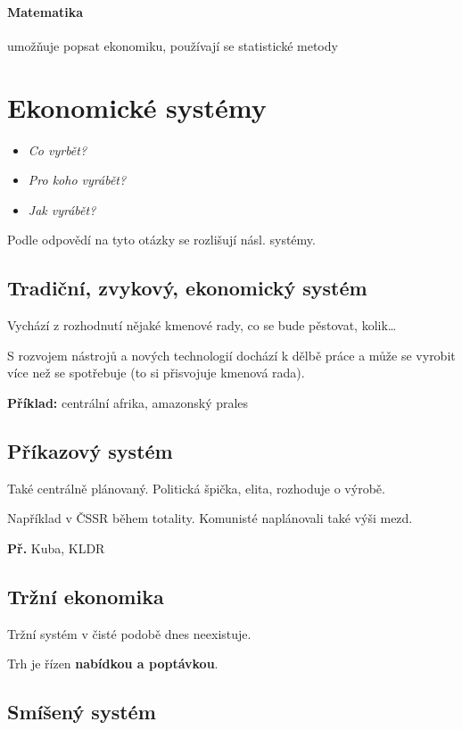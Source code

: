 \documentclass[10pt,a4paper,
twoside,%
]{report}
\begin{document}
\paragraph{Matematika} umožňuje popsat ekonomiku, používají se statistické metody

\section{Ekonomické systémy}

\begin{itemize}
\item\emph{Co vyrbět?}
\item\emph{Pro koho vyrábět?}
\item\emph{Jak vyrábět?}
\end{itemize}

Podle odpovědí na tyto otázky se rozlišují násl. systémy.

\subsection{Tradiční, zvykový, ekonomický systém}

Vychází z rozhodnutí nějaké kmenové rady, co se bude pěstovat, kolik\dots

S rozvojem nástrojů a nových technologií dochází k dělbě práce a může se vyrobit více než se spotřebuje (to si přisvojuje kmenová rada).

\textbf{Příklad:} centrální afrika, amazonský prales

\subsection{Příkazový systém}

Také centrálně plánovaný. Politická špička, elita, rozhoduje o výrobě.

Například v ČSSR během totality. Komunisté naplánovali také výši mezd.

\textbf{Př.} Kuba, KLDR

\subsection{Tržní ekonomika}

Tržní systém v čisté podobě dnes neexistuje.

Trh je řízen \textbf{nabídkou a poptávkou}. 

\subsection{Smíšený systém}
\end{document}
